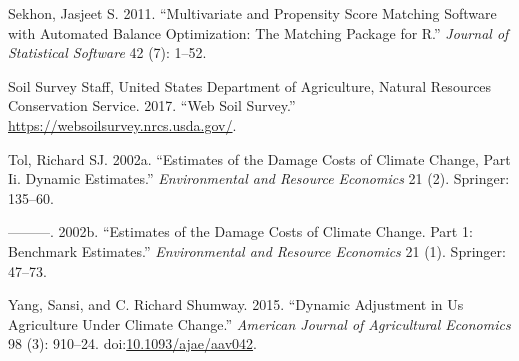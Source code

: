 \documentclass[AER]{AEA}
\begin{document}
\hypertarget{ref-Sekhon2011}{}
Sekhon, Jasjeet S. 2011. ``Multivariate and Propensity Score Matching
Software with Automated Balance Optimization: The Matching Package for
R.'' \emph{Journal of Statistical Software} 42 (7): 1--52.

\hypertarget{ref-SSURGO}{}
Soil Survey Staff, United States Department of Agriculture, Natural
Resources Conservation Service. 2017. ``Web Soil Survey.''
\url{https://websoilsurvey.nrcs.usda.gov/}.

\hypertarget{ref-Tol2002b}{}
Tol, Richard SJ. 2002a. ``Estimates of the Damage Costs of Climate
Change, Part Ii. Dynamic Estimates.'' \emph{Environmental and Resource
Economics} 21 (2). Springer: 135--60.

\hypertarget{ref-Tol2002a}{}
---------. 2002b. ``Estimates of the Damage Costs of Climate Change.
Part 1: Benchmark Estimates.'' \emph{Environmental and Resource
Economics} 21 (1). Springer: 47--73.

\hypertarget{ref-YangShumway2015}{}
Yang, Sansi, and C. Richard Shumway. 2015. ``Dynamic Adjustment in Us
Agriculture Under Climate Change.'' \emph{American Journal of
Agricultural Economics} 98 (3): 910--24.
doi:\href{https://doi.org/10.1093/ajae/aav042}{10.1093/ajae/aav042}.
\end{document}
